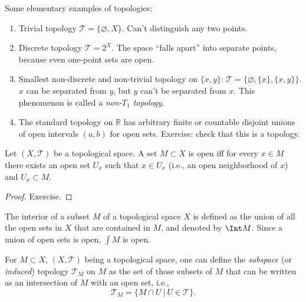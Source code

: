 \begin{example} Some elementary examples of topologies:
\begin{enumerate}
    \item Trivial topology $\mathcal T=\{\varnothing,X\}$. Can't distinguish any two points.
    \item Discrete topology $\mathcal T=2^X$. The space ``falls apart'' into separate points, because even one-point sets are open.
    \item Smallest non-discrete and non-trivial topology on $\{x,y\}$: $\mathcal{T}=\{\varnothing,\{x\},\{x,y\}\}$. $x$ can be separated from $y$, but $y$ can't be separated from $x$. This phenomenon is called a \emph{non-$T_1$ topology}.
    \item The standard topology on $\mathbb R$ has arbitrary finite or countable disjoint unions of open intervals $(a,b)$ for open sets. Exercise: check that this is a topology.
\end{enumerate}
\end{example}
\begin{prop}\label{open iff contains neighborhoods}
    Let $(X,\mathcal{T})$ be a topological space. A set $M\subset X$ is open iff for every $x\in M$ there exists an open set $U_x$ such that $x\in U_x$ (i.e., an open neighborhood of $x$) and $U_x\subset M$.
\end{prop}
\begin{proof}
    Exercise.
\end{proof}

\begin{defn}[Interior]
The interior of a subset $M$ of a topological space $X$ is defined as the union of all the open sets in $X$ that are contained in $M$, and denoted by $\Int M$. Since a union of open sets is open, $\int M$ is open.
\end{defn}


\begin{defn}
    For $M\subset X$, $(X,\mathcal{T})$ being a topological space, one can define the \emph{subspace} (or \emph{induced}) topology $\mathcal{T}_M$ on $M$ as the set of those subsets of $M$ that can be written as an intersection of $M$ with an open set, i.e.,
\begin{equation}
    \mathcal{T}_M = \{ M\cap U ~|~ U\in \mathcal{T} \}.
\end{equation}
\end{defn}

